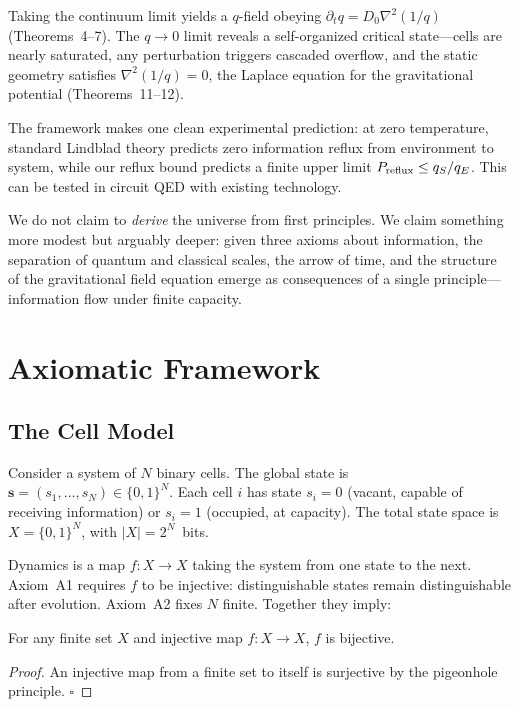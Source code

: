 \documentclass[reprint]{revtex4-2}
\begin{document}
Taking the continuum limit yields a $q$-field obeying $\partial_t q = D_0\nabla^2(1/q)$ (Theorems~4--7). The $q\to 0$ limit reveals a self-organized critical state---cells are nearly saturated, any perturbation triggers cascaded overflow, and the static geometry satisfies $\nabla^2(1/q)=0$, the Laplace equation for the gravitational potential (Theorems~11--12).

The framework makes one clean experimental prediction: at zero temperature, standard Lindblad theory predicts zero information reflux from environment to system, while our reflux bound predicts a finite upper limit $P_{\rm reflux}\le q_S/q_E$. This can be tested in circuit QED with existing technology.

We do not claim to \emph{derive} the universe from first principles. We claim something more modest but arguably deeper: given three axioms about information, the separation of quantum and classical scales, the arrow of time, and the structure of the gravitational field equation emerge as consequences of a single principle---information flow under finite capacity.

\section{Axiomatic Framework}

\subsection{The Cell Model}

Consider a system of $N$ binary cells. The global state is $\mathbf{s}=(s_1,\ldots,s_N)\in\{0,1\}^N$. Each cell $i$ has state $s_i=0$ (vacant, capable of receiving information) or $s_i=1$ (occupied, at capacity). The total state space is $X=\{0,1\}^N$, with $|X|=2^N$~bits.

Dynamics is a map $f:X\to X$ taking the system from one state to the next. Axiom~A1 requires $f$ to be injective: distinguishable states remain distinguishable after evolution. Axiom~A2 fixes $N$ finite. Together they imply:

\begin{theorem}[Bijection]
\label{thm:bijection}
For any finite set $X$ and injective map $f:X\to X$, $f$ is bijective.
\end{theorem}
\begin{proof}
An injective map from a finite set to itself is surjective by the pigeonhole principle. $\square$
\end{proof}
\end{document}
